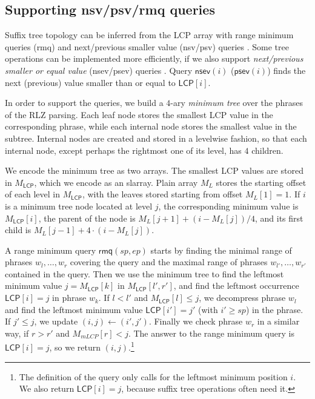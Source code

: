 \documentclass[a4paper,11pt]{llncs}
\newcommand{\LCP}{\textsf{LCP}}
\newcommand{\mLCP}{\ensuremath{\mathsf{LCP}}}
\newcommand{\RLZ}{\textsf{RLZ}}
\newcommand{\slarray}{\textsf{slarray}}
\newcommand{\nsv}{\textsf{nsv}}
\newcommand{\nsev}{\textsf{nsev}}
\newcommand{\psv}{\textsf{psv}}
\newcommand{\psev}{\textsf{psev}}
\newcommand{\rmq}{\textsf{rmq}}
\newcommand{\mpsev}{\ensuremath{\mathsf{psev}}}
\newcommand{\mnsev}{\ensuremath{\mathsf{nsev}}}
\newcommand{\mrmq}{\ensuremath{\mathsf{rmq}}}
\begin{document}
\subsection{Supporting \nsv/\psv/\rmq{} queries}

Suffix tree topology can be inferred from the \LCP{} array with range minimum queries (\rmq) and next/previous smaller value (\nsv/\psv) queries \cite{Fischer2009a}. Some tree operations can be implemented more efficiently, if we also support \emph{next/previous smaller or equal value} (\nsev/\psev) queries \cite{Abeliuk2013}. Query $\mnsev(i)$ ($\mpsev(i)$) finds the next (previous) value smaller than or equal to $\mLCP[i]$.

In order to support the queries, we build a $4$-ary \emph{minimum tree} over the phrases of the \RLZ{} parsing. Each leaf node stores the smallest \LCP{} value in the corresponding phrase, while each internal node stores the smallest value in the subtree. Internal nodes are created and stored in a levelwise fashion, so that each internal node, except perhaps the rightmost one of its level, has $4$ children.

We encode the minimum tree as two arrays. The smallest \LCP{} values are stored in $M_{\mLCP}$, which we encode as an \slarray. Plain array $M_{L}$ stores the starting offset of each level in $M_{\mLCP}$, with the leaves stored starting from offset $M_{L}[1] = 1$. If $i$ is a minimum tree node located at level $j$, the corresponding minimum value is $M_{\mLCP}[i]$, the parent of the node is $M_{L}[j+1] + (i - M_{L}[j]) / 4$, and its first child is $M_{L}[j-1] + 4 \cdot (i - M_{L}[j])$.

A range minimum query $\mrmq(sp,ep)$ starts by finding the minimal range of phrases $w_{l}, \dotsc, w_{r}$ covering the query and the maximal range of phrases $w_{l'}, \dotsc, w_{r'}$ contained in the query. Then we use the minimum tree to find the leftmost minimum value $j = M_{\mLCP}[k]$ in $M_{\mLCP}[l',r']$, and find the leftmost occurrence $\mLCP[i] = j$ in phrase $w_{k}$. If $l < l'$ and $M_{\mLCP}[l] \le j$, we decompress phrase $w_{l}$ and find the leftmost minimum value $\mLCP[i'] = j'$ (with $i' \ge sp$) in the phrase. If $j' \le j$, we update $(i,j) \leftarrow (i',j')$. Finally we check phrase $w_{r}$ in a similar way, if $r > r'$ and $M_{mLCP}[r] < j$. The answer to the range minimum query is $\mLCP[i] = j$, so we return $(i,j)$.\footnote{The definition of the query only calls for the leftmost minimum position $i$. We also return $\mLCP[i] = j$, because suffix tree operations often need it.}
\end{document}
